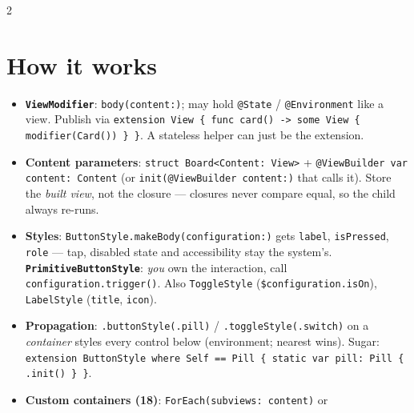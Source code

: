 \documentclass[8pt]{extarticle}
\newcommand\arr{\texttt{\hbox{-}\hbox{>}}}
\newcommand\eqeq{\texttt{\hbox{=}\hbox{=}}}
\begin{document}



\begin{multicols}{2}
\raggedright

\section{How it works}
\begin{itemize}
  \item \textbf{\texttt{ViewModifier}}: \texttt{body(content:)}; may hold \texttt{@State} /
        \texttt{@Environment} like a view. Publish via \texttt{extension View \{ func card() \arr\ some View
        \{ modifier(Card()) \} \}}. A stateless helper can just be the extension.
  \item \textbf{Content parameters}: \texttt{struct Board<Content: View>} + \texttt{@ViewBuilder var
        content: Content} (or \texttt{init(@ViewBuilder content:)} that calls it). Store the \emph{built view},
        not the closure — closures never compare equal, so the child always re-runs.
  \item \textbf{Styles}: \texttt{ButtonStyle.makeBody(configuration:)} gets \texttt{label},
        \texttt{isPressed}, \texttt{role} — tap, disabled state and accessibility stay the system's.
        \textbf{\texttt{PrimitiveButtonStyle}}: \emph{you} own the interaction, call
        \texttt{configuration.trigger()}. Also \texttt{ToggleStyle} (\texttt{\$configuration.isOn}),
        \texttt{LabelStyle} (\texttt{title}, \texttt{icon}).
  \item \textbf{Propagation}: \texttt{.buttonStyle(.pill)} / \texttt{.toggleStyle(.switch)} on a
        \emph{container} styles every control below (environment; nearest wins). Sugar:
        \texttt{extension ButtonStyle where Self \eqeq\ Pill \{ static var pill: Pill \{ .init() \} \}}.
  \item \textbf{Custom containers (18)}: \texttt{ForEach(subviews: content)} or

\end{itemize}
\end{multicols}
\end{document}
